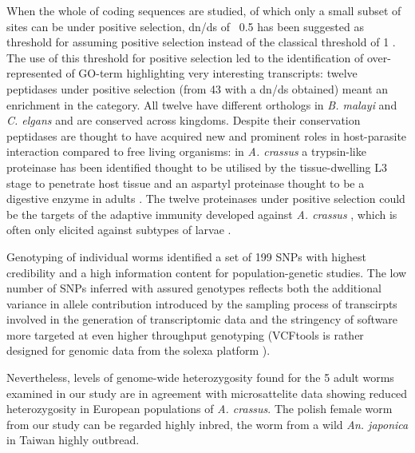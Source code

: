 \documentclass[10pt]{bmc_article}
\newenvironment{bmcformat}{\begin{raggedright}\baselineskip20pt\sloppy\setboolean{publ}{false}}{\end{raggedright}\baselineskip20pt\sloppy}
\begin{document}
\begin{bmcformat}
When the whole of coding sequences are studied, of which only a small
subset of sites can be under positive selection, dn/ds of ~0.5 has
been suggested as threshold for assuming positive selection
\cite{pmid15579698} instead of the classical threshold of 1
\cite{pmid6449605}. The use of this threshold for positive selection
led to the identification of over-represented of GO-term highlighting
very interesting transcripts: twelve peptidases under positive
selection (from 43 with a dn/ds obtained) meant an enrichment in the
category. All twelve have different orthologs in \textit{B. malayi}
and \textit{C. elgans} and are conserved across kingdoms. Despite
their conservation peptidases are thought to have acquired new and
prominent roles in host-parasite interaction compared to free living
organisms: in \textit{A. crassus} a trypsin-like proteinase has been
identified thought to be utilised by the tissue-dwelling L3 stage to
penetrate host tissue and an aspartyl proteinase thought to be a
digestive enzyme in adults \cite{polzer_identification_1993}. The
twelve proteinases under positive selection could be the targets of
the adaptive immunity developed against \textit{A. crassus}
\cite{knopf_migratory_2008, knopf_vaccination_2008}, which is often
only elicited against subtypes of larvae \cite{molnar_caps}.


Genotyping of individual worms identified a set of
199 SNPs with highest credibility and a high
information content for population-genetic studies. The low number of
SNPs inferred with assured genotypes reflects both the additional
variance in allele contribution introduced by the sampling process of
transcirpts involved in the generation of transcriptomic data and the
stringency of software more targeted at even higher throughput
genotyping (VCFtools is rather designed for genomic data from the
solexa platform \cite{pmid21653522x}).

Nevertheless, levels of genome-wide heterozygosity found for the 5
adult worms examined in our study are in agreement with microsattelite
data \cite{wielgoss_population_2008} showing reduced heterozygosity in
European populations of \textit{A. crassus}. The polish female worm
from our study can be regarded highly inbred, the worm from a wild
\textit{An. japonica} in Taiwan highly outbread.


\end{bmcformat}
\end{document}
